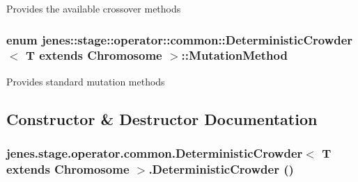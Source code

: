 Provides the available crossover methods \hypertarget{classjenes_1_1stage_1_1operator_1_1common_1_1_deterministic_crowder_3_01_t_01extends_01_chromosome_01_4_40d00705655302bc78c3e60aca4c43b5}{
\subsubsection[MutationMethod]{\setlength{\rightskip}{0pt plus 5cm}enum jenes::stage::operator::common::DeterministicCrowder$<$ T extends Chromosome $>$::{\bf MutationMethod}}}
\label{classjenes_1_1stage_1_1operator_1_1common_1_1_deterministic_crowder_3_01_t_01extends_01_chromosome_01_4_40d00705655302bc78c3e60aca4c43b5}


Provides standard mutation methods 

\subsection{Constructor \& Destructor Documentation}
\hypertarget{classjenes_1_1stage_1_1operator_1_1common_1_1_deterministic_crowder_3_01_t_01extends_01_chromosome_01_4_d52c0d6a4bc032c8c198bf05cc3acf6f}{
\subsubsection[DeterministicCrowder]{\setlength{\rightskip}{0pt plus 5cm}jenes.stage.operator.common.DeterministicCrowder$<$ T extends Chromosome $>$.DeterministicCrowder ()}}
\label{classjenes_1_1stage_1_1operator_1_1common_1_1_deterministic_crowder_3_01_t_01extends_01_chromosome_01_4_d52c0d6a4bc032c8c198bf05cc3acf6f}


